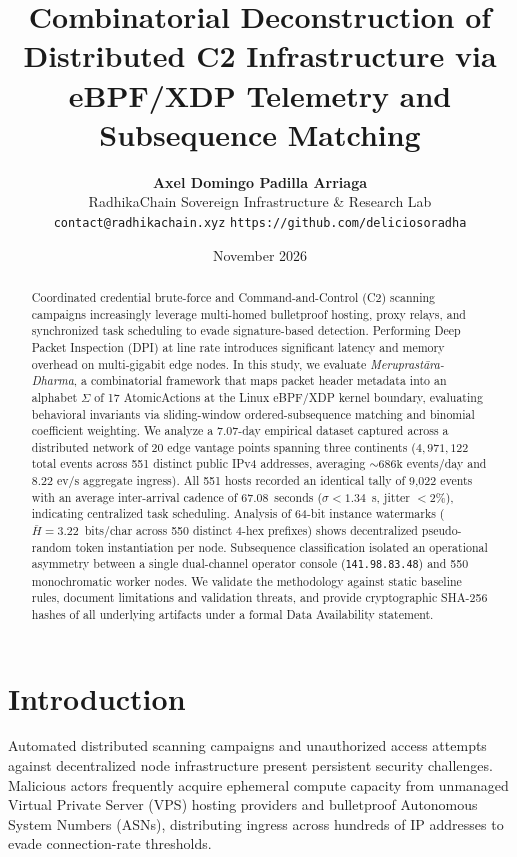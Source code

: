 \documentclass[10pt,twocolumn]{article}
\title{\textbf{Combinatorial Deconstruction of Distributed C2 Infrastructure via eBPF/XDP Telemetry and Subsequence Matching}}
\author{
    \textbf{Axel Domingo Padilla Arriaga}\\
    RadhikaChain Sovereign Infrastructure \& Research Lab\\
    \texttt{contact@radhikachain.xyz} \quad \texttt{https://github.com/deliciosoradha}
}
\date{November 2026}
\begin{document}
\maketitle

\begin{abstract}
Coordinated credential brute-force and Command-and-Control (C2) scanning campaigns increasingly leverage multi-homed bulletproof hosting, proxy relays, and synchronized task scheduling to evade signature-based detection. Performing Deep Packet Inspection (DPI) at line rate introduces significant latency and memory overhead on multi-gigabit edge nodes. In this study, we evaluate \textit{Meruprast\={a}ra-Dharma}, a combinatorial framework that maps packet header metadata into an alphabet $\Sigma$ of 17 AtomicActions at the Linux eBPF/XDP kernel boundary, evaluating behavioral invariants via sliding-window ordered-subsequence matching and binomial coefficient weighting. We analyze a 7.07-day empirical dataset captured across a distributed network of 20 edge vantage points spanning three continents ($4,971,122$ total events across 551 distinct public IPv4 addresses, averaging $\sim 686\text{k}$ events/day and $8.22\text{ ev/s}$ aggregate ingress). All 551 hosts recorded an identical tally of 9,022 events with an average inter-arrival cadence of $67.08$~seconds ($\sigma < 1.34$~s, jitter $<2\%$), indicating centralized task scheduling. Analysis of 64-bit instance watermarks ($\bar{H} = 3.22$~bits/char across 550 distinct 4-hex prefixes) shows decentralized pseudo-random token instantiation per node. Subsequence classification isolated an operational asymmetry between a single dual-channel operator console (\texttt{141.98.83.48}) and 550 monochromatic worker nodes. We validate the methodology against static baseline rules, document limitations and validation threats, and provide cryptographic SHA-256 hashes of all underlying artifacts under a formal Data Availability statement.
\end{abstract}

\section{Introduction}
Automated distributed scanning campaigns and unauthorized access attempts against decentralized node infrastructure present persistent security challenges. Malicious actors frequently acquire ephemeral compute capacity from unmanaged Virtual Private Server (VPS) hosting providers and bulletproof Autonomous System Numbers (ASNs), distributing ingress across hundreds of IP addresses to evade connection-rate thresholds. 
\end{document}
